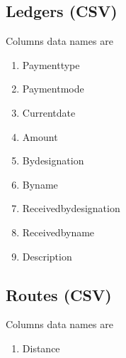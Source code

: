 \documentclass[12pt,a4paper]{article}
\begin{document}
\subsection{Ledgers (CSV)}
Columns data names are
\begin{enumerate}
\item Paymenttype 			
\item Paymentmode 			
\item Currentdate 			
\item Amount 				
\item Bydesignation 		
\item Byname 				
\item Receivedbydesignation
\item Receivedbyname 		
\item Description 	

\end{enumerate}


\subsection{Routes (CSV)}
Columns data names are
\begin{enumerate}
\item Distance 
\end{enumerate}



\end{document}
